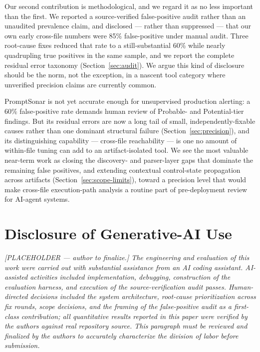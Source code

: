 \documentclass[sigconf,anonymous,review]{acmart}
\newcommand{\sysname}{PromptSonar}
\begin{document}
Our second contribution is methodological, and we regard it as no less important than the first. We reported a source-verified false-positive audit rather than an unaudited prevalence claim, and disclosed --- rather than suppressed --- that our own early cross-file numbers were 85\% false-positive under manual audit. Three root-cause fixes reduced that rate to a still-substantial 60\% while nearly quadrupling true positives in the same sample, and we report the complete residual error taxonomy (Section~\ref{sec:audit}). We argue this kind of disclosure should be the norm, not the exception, in a nascent tool category where unverified precision claims are currently common.

\sysname{} is not yet accurate enough for unsupervised production alerting: a 60\% false-positive rate demands human review of Probable- and Potential-tier findings. But its residual errors are now a long tail of small, independently-fixable causes rather than one dominant structural failure (Section~\ref{sec:precision}), and its distinguishing capability --- cross-file reachability --- is one no amount of within-file tuning can add to an artifact-isolated tool. We see the most valuable near-term work as closing the discovery- and parser-layer gaps that dominate the remaining false positives, and extending contextual control-state propagation across artifacts (Section~\ref{sec:scope-limits}), toward a precision level that would make cross-file execution-path analysis a routine part of pre-deployment review for AI-agent systems.




\section*{Disclosure of Generative-AI Use}
\emph{[PLACEHOLDER --- author to finalize.] The engineering and evaluation of this
work were carried out with substantial assistance from an AI coding assistant.
AI-assisted activities included implementation, debugging, construction of the
evaluation harness, and execution of the source-verification audit passes.
Human-directed decisions included the system architecture, root-cause
prioritization across fix rounds, scope decisions, and the framing of the
false-positive audit as a first-class contribution; all quantitative results
reported in this paper were verified by the authors against real repository
source. This paragraph must be reviewed and finalized by the authors to
accurately characterize the division of labor before submission.}
\end{document}

